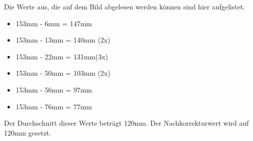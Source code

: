 Die Werte aus, die auf dem Bild abgelesen werden können sind hier aufgelistet.

\begin{itemize}
    \item 153mm - 6mm = 147mm
    \item 153mm - 13mm = 140mm (2x)
    \item 153mm - 22mm = 131mm(3x)
    \item 153mm - 50mm = 103mm (2x)
    \item 153mm - 56mm = 97mm 
    \item 153mm - 76mm = 77mm
\end{itemize}

Der Durchschnitt dieser Werte beträgt 120mm. Der Nachkorrekturwert wird auf 120mm gesetzt.


